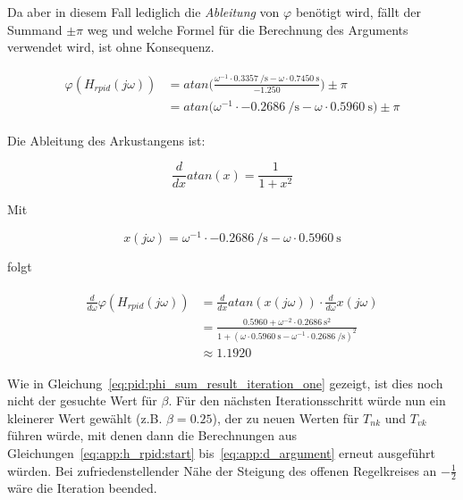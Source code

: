 Da aber in diesem Fall lediglich die \emph{Ableitung} von $\varphi$ ben\"otigt
wird, f\"allt der Summand $\pm\pi$ weg  und welche Formel f\"ur die Berechnung
des  Arguments   verwendet  wird,  ist  ohne   Konsequenz.

\begin{gather} \label{eq:app:argument_numerical}
    \begin{split}
        \varphi(H_{rpid}(j\omega)) & = atan \biggl( \frac{ \omega^{-1} \cdot \SI{0.3357}{\per\second} - \omega \cdot \SI{0.7450}{\second} }{ -1.250 } \biggr) \pm \pi \\
                                   & = atan \biggl( \omega^{-1} \cdot \SI{-0.2686}{\per\second}       - \omega \cdot \SI{0.5960}{\second}             \biggr) \pm \pi
    \end{split}
\end{gather}

Die Ableitung des Arkustangens ist:

\begin{equation} \label{eq:app:d_atan}
    \frac{d}{dx} atan(x) = \frac{1}{1+x^2}
\end{equation}

Mit

\begin{equation} \label{eq:app:x_of_omega}
    x(j\omega) = \omega^{-1} \cdot \SI{-0.2686}{\per\second} - \omega \cdot \SI{0.5960}{\second}
\end{equation}

folgt

\begin{gather} \label{eq:app:d_argument}
    \begin{split}
        \frac{d}{d\omega} \varphi(H_{rpid}(j\omega)) & = \frac{d}{dx} atan(x(j\omega)) \cdot \frac{d}{d\omega} x(j\omega) \\
                                                     & = \frac{0.5960 + \omega^{-2} \cdot \SI{0.2686}{\square\second}}{1+(\omega \cdot \SI{0.5960}{\second} - \omega^{-1} \cdot \SI{0.2686}{\per\second})^2} \\
                                                     & \approx 1.1920
    \end{split}
\end{gather}


Wie    in  Gleichung~\ref{eq:pid:phi_sum_result_iteration_one}  gezeigt,   ist
dies  noch  nicht  der  gesuchte  Wert  f\"ur  $\beta$. F\"ur  den  n\"achsten
Iterationsschritt    w\"urde     nun    ein    kleinerer     Wert    gew\"ahlt
(z.B.   $\beta=0.25$),    der   zu    neuen   Werten   f\"ur    $T_{nk}$   und
$T_{vk}$   f\"uhren   w\"urde,   mit   denen   dann   die   Berechnungen   aus
Gleichungen~\ref{eq:app:h_rpid:start}    bis~\ref{eq:app:d_argument}    erneut
ausgef\"uhrt w\"urden. Bei zufriedenstellender N\"ahe der Steigung des offenen
Regelkreises an $-\frac{1}{2}$ w\"are die Iteration beended.
